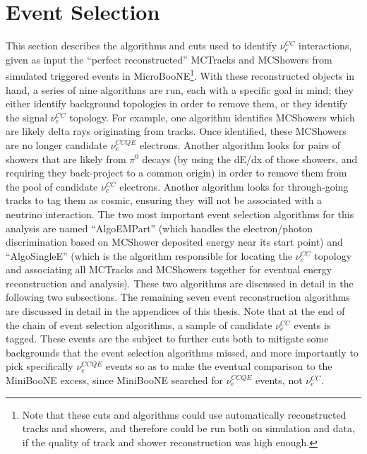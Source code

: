 \section{Event Selection}\label{LEE_eventselection_section}
This section describes the algorithms and cuts used to identify $\nu_e^{CC}$ interactions, given as input the ``perfect reconstructed'' {\sc MCTracks} and {\sc MCShowers} from simulated triggered events in MicroBooNE\footnote{Note that these cuts and algorithms could use automatically reconstructed tracks and showers, and therefore could be run both on simulation and data, if the quality of track and shower reconstruction was high enough.}. With these reconstructed objects in hand, a series of nine algorithms are run, each with a specific goal in mind; they either identify background topologies in order to remove them, or they identify the signal $\nu_e^{CC}$ topology. For example, one algorithm identifies {\sc MCShowers} which are likely delta rays originating from tracks. Once identified, these {\sc MCShowers} are no longer candidate $\nu_e^{CCQE}$ electrons. Another algorithm looks for pairs of showers that are likely from $\pi^0$ decays (by using the dE/dx of those showers, and requiring they back-project to a common origin) in order to remove them from the pool of candidate $\nu_e^{CC}$ electrons. Another algorithm looks for through-going tracks to tag them as cosmic, ensuring they will not be associated with a neutrino interaction. The two most important event selection algorithms for this analysis are named ``AlgoEMPart'' (which handles the electron/photon discrimination based on {\sc MCShower} deposited energy near its start point) and ``AlgoSingleE'' (which is the algorithm responsible for locating the $\nu_e^{CC}$ topology and associating all {\sc MCTracks} and {\sc MCShowers} together for eventual energy reconstruction and analysis). These two algorithms are discussed in detail in the following two subsections. The remaining seven event reconstruction algorithms are discussed in detail in the appendices of this thesis. Note that at the end of the chain of event selection algorithms, a sample of candidate $\nu_e^{CC}$ events is tagged. These events are the subject to further cuts both to mitigate some backgrounds that the event selection algorithms missed, and more importantly to pick specifically $\nu_e^{CCQE}$ events so as to make the eventual comparison to the MiniBooNE excess, since MiniBooNE searched for $\nu_e^{CCQE}$ events, not $\nu_e^{CC}$.



